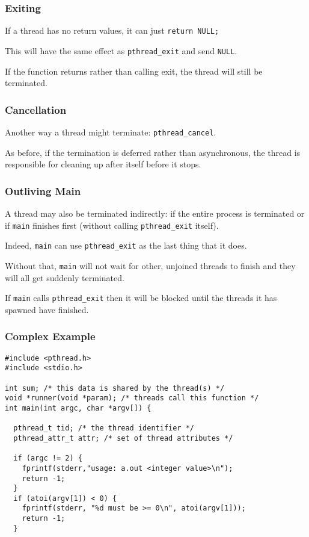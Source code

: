 \begin{frame}
\frametitle{Exiting}

If a thread has no return values, it can just \texttt{return NULL;} 

This will have the same effect as \texttt{pthread\_exit} and send \texttt{NULL}.

If the function returns rather than calling exit, the thread will still be terminated. 




\end{frame}


\begin{frame}
\frametitle{Cancellation}

Another way a thread might terminate: \texttt{pthread\_cancel}. 

As before, if the termination is deferred rather than asynchronous, the thread is responsible for cleaning up after itself before it stops.

\end{frame}


\begin{frame}
\frametitle{Outliving Main}

A thread may also be terminated indirectly: if the entire process is terminated or if \texttt{main} finishes first (without calling \texttt{pthread\_exit} itself). 

Indeed, \texttt{main} can use \texttt{pthread\_exit} as the last thing that it does. 

Without that, \texttt{main} will not wait for other, unjoined threads to finish and they will all get suddenly terminated. 

If \texttt{main} calls \texttt{pthread\_exit} then it will be blocked until the threads it has spawned have finished.

\end{frame}


\begin{frame}[fragile]
\frametitle{Complex Example}

\begin{verbatim}
#include <pthread.h>
#include <stdio.h>

int sum; /* this data is shared by the thread(s) */
void *runner(void *param); /* threads call this function */
int main(int argc, char *argv[]) {

  pthread_t tid; /* the thread identifier */
  pthread_attr_t attr; /* set of thread attributes */

  if (argc != 2) {
    fprintf(stderr,"usage: a.out <integer value>\n"); 
    return -1;
  }
  if (atoi(argv[1]) < 0) {
    fprintf(stderr, "%d must be >= 0\n", atoi(argv[1])); 
    return -1;
  }
\end{verbatim}



\end{frame}

